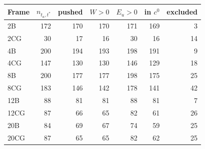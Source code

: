 \begin{tabular}{lrrrrrr}
\toprule
Frame & $n_{t_a,t^*}$ & pushed & $W>0$ & $E_u>0$ & in $c^0$ & excluded \\
\midrule
2B & 172 & 170 & 170 & 171 & 169 & 3 \\
2CG & 30 & 17 & 16 & 30 & 16 & 14 \\
4B & 200 & 194 & 193 & 198 & 191 & 9 \\
4CG & 147 & 130 & 130 & 146 & 129 & 18 \\
8B & 200 & 177 & 177 & 198 & 175 & 25 \\
8CG & 183 & 146 & 142 & 178 & 141 & 42 \\
12B & 88 & 81 & 81 & 88 & 81 & 7 \\
12CG & 87 & 66 & 65 & 82 & 61 & 26 \\
20B & 84 & 69 & 67 & 74 & 59 & 25 \\
20CG & 87 & 65 & 65 & 82 & 62 & 25 \\
\bottomrule
\end{tabular}